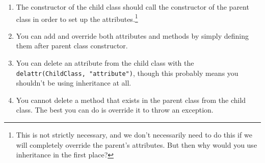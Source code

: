   \begin{enumerate}
    \item The constructor of the child class should call the constructor of the parent class in order to set up the attributes.\footnote{This is not strictly necessary, and we don't necessarily need to do this if we will completely override the parent's attributes. But then why would you use inheritance in the first place?} 

    \item You can add and override both attributes and methods by simply defining them after parent class constructor.   
    \item You can delete an attribute from the child class with the \texttt{delattr(ChildClass, "attribute")}, though this probably means you shouldn't be using inheritance at all. 
    \item You cannot delete a method that exists in the parent class from the child class. The best you can do is override it to throw an exception. 
  \end{enumerate}



